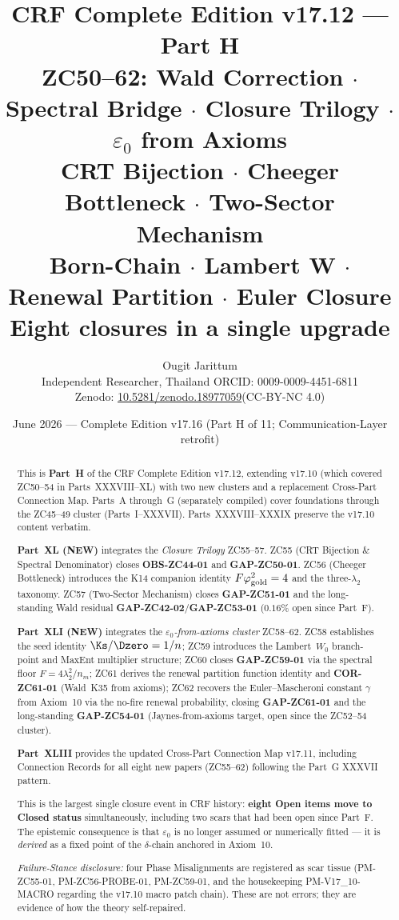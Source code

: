 \documentclass[12pt, a4paper]{article}
\title{%
  \textbf{\color{deepblue}CRF Complete Edition v17.12 --- Part H}\\[0.4em]
  \large ZC50--62: Wald Correction $\cdot$ Spectral Bridge $\cdot$
  Closure Trilogy $\cdot$ $\varepsilon_0$ from Axioms\\[0.2em]
  \normalsize\color{mutedgray}
  CRT Bijection $\cdot$ Cheeger Bottleneck $\cdot$ Two-Sector Mechanism\\
  Born-Chain $\cdot$ Lambert W $\cdot$ Renewal Partition $\cdot$ Euler Closure\\[0.2em]
  \textbf{\color{crfgreen}Eight closures in a single upgrade}
}
\author{Ougit Jarittum\\
\small Independent Researcher, Thailand\quad
ORCID: 0009-0009-4451-6811\\
\small Zenodo: \href{https://doi.org/10.5281/zenodo.18977059}%
{10.5281/zenodo.18977059}\quad (CC-BY-NC 4.0)
}
\date{June 2026 --- Complete Edition v17.16 (Part H of 11; Communication-Layer retrofit)}
\begin{document}

\maketitle

\begin{abstract}
\sloppy
This is \textbf{Part~H} of the CRF Complete Edition v17.12, extending
v17.10 (which covered ZC50--54 in Parts~XXXVIII--XL) with two new
clusters and a replacement Cross-Part Connection Map. Parts~A through~G
(separately compiled) cover foundations through the ZC45--49 cluster
(Parts~I--XXXVII). Parts~XXXVIII--XXXIX preserve the v17.10 content
verbatim.

\textbf{Part~XL (NEW)} integrates the \emph{Closure Trilogy} ZC55--57.
ZC55 (CRT Bijection \& Spectral Denominator) closes \textbf{OBS-ZC44-01}
and \textbf{GAP-ZC50-01}. ZC56 (Cheeger Bottleneck) introduces the K14
companion identity $F\varphi_{\rm gold}^{2}=4$ and the three-$\lambda_{2}$
taxonomy. ZC57 (Two-Sector Mechanism) closes \textbf{GAP-ZC51-01} and
the long-standing Wald residual \textbf{GAP-ZC42-02}/\textbf{GAP-ZC53-01}
($0.16\%$ open since Part~F).

\textbf{Part~XLI (NEW)} integrates the \emph{$\varepsilon_0$-from-axioms
cluster} ZC58--62. ZC58 establishes the seed identity $\Ks/\Dzero=1/n$;
ZC59 introduces the Lambert~$W_0$ branch-point and MaxEnt multiplier
structure; ZC60 closes \textbf{GAP-ZC59-01} via the spectral floor
$F=4\lambda_{2}^{2}/n_m$; ZC61 derives the renewal partition function
identity and \textbf{COR-ZC61-01} (Wald~K35 from axioms); ZC62
recovers the Euler--Mascheroni constant $\gamma$ from Axiom~10 via the
no-fire renewal probability, closing \textbf{GAP-ZC61-01} and the
long-standing \textbf{GAP-ZC54-01} (Jaynes-from-axioms target, open
since the ZC52--54 cluster).

\textbf{Part~XLIII} provides the updated Cross-Part Connection Map
v17.11, including Connection Records for all eight new papers
(ZC55--62) following the Part~G XXXVII pattern.

This is the largest single closure event in CRF history:
\textbf{eight Open items move to Closed status} simultaneously,
including two scars that had been open since Part~F. The
epistemic consequence is that $\varepsilon_0$ is no longer assumed
or numerically fitted --- it is \emph{derived} as a fixed point of
the $\delta$-chain anchored in Axiom~10.

\medskip
\noindent\emph{Failure-Stance disclosure:} four Phase Misalignments
are registered as scar tissue (PM-ZC55-01, PM-ZC56-PROBE-01,
PM-ZC59-01, and the housekeeping PM-V17\_10-MACRO regarding the
v17.10 macro patch chain). These are not errors; they are evidence
of how the theory self-repaired.
\end{abstract}
\end{document}
